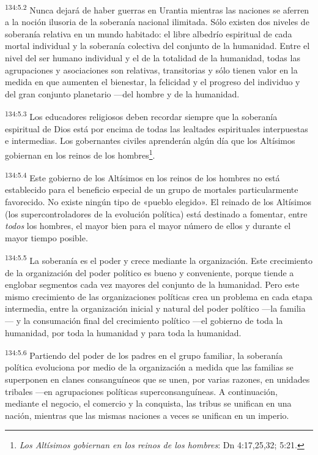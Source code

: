\par
\textsuperscript{134:5.2} Nunca dejará de haber guerras en Urantia mientras las naciones se aferren a la noción ilusoria de la soberanía nacional ilimitada. Sólo existen dos niveles de soberanía relativa en un mundo habitado: el libre albedrío espiritual de cada mortal individual y la soberanía colectiva del conjunto de la humanidad. Entre el nivel del ser humano individual y el de la totalidad de la humanidad, todas las agrupaciones y asociaciones son relativas, transitorias y sólo tienen valor en la medida en que aumenten el bienestar, la felicidad y el progreso del individuo y del gran conjunto planetario ---del hombre y de la humanidad.

\par
\textsuperscript{134:5.3} Los educadores religiosos deben recordar siempre que la soberanía espiritual de Dios está por encima de todas las lealtades espirituales interpuestas e intermedias. Los gobernantes civiles aprenderán algún día que los Altísimos gobiernan en los reinos de los hombres\footnote{\textit{Los Altísimos gobiernan en los reinos de los hombres}: Dn 4:17,25,32; 5:21.}.

\par
\textsuperscript{134:5.4} Este gobierno de los Altísimos en los reinos de los hombres no está establecido para el beneficio especial de un grupo de mortales particularmente favorecido. No existe ningún tipo de «pueblo elegido». El reinado de los Altísimos (los supercontroladores de la evolución política) está destinado a fomentar, entre \textit{todos} los hombres, el mayor bien para el mayor número de ellos y durante el mayor tiempo posible.

\par
\textsuperscript{134:5.5} La soberanía es el poder y crece mediante la organización. Este crecimiento de la organización del poder político es bueno y conveniente, porque tiende a englobar segmentos cada vez mayores del conjunto de la humanidad. Pero este mismo crecimiento de las organizaciones políticas crea un problema en cada etapa intermedia, entre la organización inicial y natural del poder político ---la familia--- y la consumación final del crecimiento político ---el gobierno de toda la humanidad, por toda la humanidad y para toda la humanidad.

\par
\textsuperscript{134:5.6} Partiendo del poder de los padres en el grupo familiar, la soberanía política evoluciona por medio de la organización a medida que las familias se superponen en clanes consanguíneos que se unen, por varias razones, en unidades tribales ---en agrupaciones políticas superconsanguíneas. A continuación, mediante el negocio, el comercio y la conquista, las tribus se unifican en una nación, mientras que las mismas naciones a veces se unifican en un imperio.


